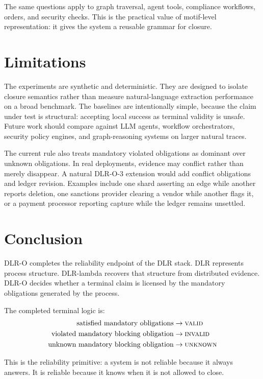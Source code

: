 \documentclass[11pt]{article}
\newcommand{\valid}{\textsc{valid}}
\newcommand{\invalid}{\textsc{invalid}}
\newcommand{\unknown}{\textsc{unknown}}
\begin{document}
The same questions apply to graph traversal, agent tools, compliance workflows,
orders, and security checks. This is the practical value of motif-level
representation: it gives the system a reusable grammar for closure.

\section{Limitations}

The experiments are synthetic and deterministic. They are designed to isolate
closure semantics rather than measure natural-language extraction performance
on a broad benchmark. The baselines are intentionally simple, because the
claim under test is structural: accepting local success as terminal validity is
unsafe. Future work should compare against LLM agents, workflow orchestrators,
security policy engines, and graph-reasoning systems on larger natural traces.

The current rule also treats mandatory violated obligations as dominant over
unknown obligations. In real deployments, evidence may conflict rather than
merely disappear. A natural DLR-O-3 extension would add conflict obligations
and ledger revision. Examples include one shard asserting an edge while
another reports deletion, one sanctions provider clearing a vendor while
another flags it, or a payment processor reporting capture while the ledger
remains unsettled.

\section{Conclusion}

DLR-O completes the reliability endpoint of the DLR stack. DLR represents
process structure. DLR-lambda recovers that structure from distributed
evidence. DLR-O decides whether a terminal claim is licensed by the mandatory
obligations generated by the process.

The completed terminal logic is:
\[
\begin{aligned}
\text{satisfied mandatory obligations} &\rightarrow \valid{} \\
\text{violated mandatory blocking obligation} &\rightarrow \invalid{} \\
\text{unknown mandatory blocking obligation} &\rightarrow \unknown{}
\end{aligned}
\]

This is the reliability primitive: a system is not reliable because it always
answers. It is reliable because it knows when it is not allowed to close.
\end{document}

